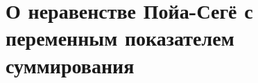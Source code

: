 \chapter{О неравенстве Пойа-Сегё с переменным показателем суммирования}
\label{chapt:variable}







